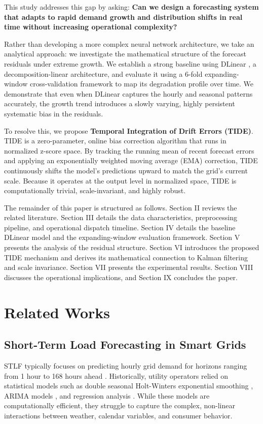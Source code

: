 \documentclass[journal]{IEEEtran}
\begin{document}
This study addresses this gap by asking: \textbf{Can we design a forecasting system that adapts to rapid demand growth and distribution shifts in real time without increasing operational complexity?}

Rather than developing a more complex neural network architecture, we take an analytical approach: we investigate the mathematical structure of the forecast residuals under extreme growth. We establish a strong baseline using DLinear \cite{zeng2023}, a decomposition-linear architecture, and evaluate it using a 6-fold expanding-window cross-validation framework to map its degradation profile over time. We demonstrate that even when DLinear captures the hourly and seasonal patterns accurately, the growth trend introduces a slowly varying, highly persistent systematic bias in the residuals.

To resolve this, we propose \textbf{Temporal Integration of Drift Errors (TIDE)}. TIDE is a zero-parameter, online bias correction algorithm that runs in normalized z-score space. By tracking the running mean of recent forecast errors and applying an exponentially weighted moving average (EMA) correction, TIDE continuously shifts the model's predictions upward to match the grid's current scale. Because it operates at the output level in normalized space, TIDE is computationally trivial, scale-invariant, and highly robust.

The remainder of this paper is structured as follows. Section II reviews the related literature. Section III details the data characteristics, preprocessing pipeline, and operational dispatch timeline. Section IV details the baseline DLinear model and the expanding-window evaluation framework. Section V presents the analysis of the residual structure. Section VI introduces the proposed TIDE mechanism and derives its mathematical connection to Kalman filtering and scale invariance. Section VII presents the experimental results. Section VIII discusses the operational implications, and Section IX concludes the paper.

\section{Related Works}
\subsection{Short-Term Load Forecasting in Smart Grids}
STLF typically focuses on predicting hourly grid demand for horizons ranging from 1 hour to 168 hours ahead \cite{hippert2001}. Historically, utility operators relied on statistical models such as double seasonal Holt-Winters exponential smoothing \cite{taylor2003}, ARIMA models \cite{box2015}, and regression analysis \cite{mbamalu1993}. While these models are computationally efficient, they struggle to capture the complex, non-linear interactions between weather, calendar variables, and consumer behavior.
\end{document}
